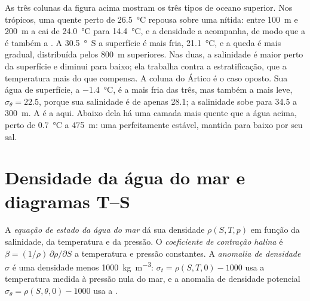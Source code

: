 As três colunas da figura acima mostram os três tipos de oceano superior. Nos trópicos, uma
 quente perto de \qty{26.5}{\celsius} repousa sobre uma  nítida: entre
\qty{100}{m} e \qty{200}{m} a  cai de \qty{24.0}{\celsius} para
\qty{14.4}{\celsius}, e a densidade a acompanha, de modo que a  é também a . A
\qty{30.5}{\degree S} a superfície é mais fria, \qty{21.1}{\celsius}, e a queda é mais gradual,
distribuída pelos \qty{800}{m} superiores. Nas duas, a salinidade é maior perto da superfície e
diminui para baixo; ela trabalha contra a estratificação, que a temperatura mais do que compensa.
A coluna do Ártico é o caso oposto. Sua água de superfície, a \qty{-1.4}{\celsius}, é a mais fria
das três, mas também a mais leve, $\sigma_\theta = 22.5$, porque sua salinidade é de apenas
\num{28.1}; a salinidade sobe para \num{34.5} a \qty{300}{m}. A  é a  aqui.
Abaixo dela há uma camada mais quente que a água acima, perto de \qty{0.7}{\celsius} a
\qty{475}{m}: uma  perfeitamente estável, mantida para baixo por seu sal.

\section{Densidade da água do mar e diagramas T--S}\label{sec:b1:fluid-envelopes-structure:ts}

\begin{definition}\label{def:b1:fluid-envelopes-structure:eos}
A \emph{equação de estado da água do mar} dá sua
densidade $\rho(S, T, p)$ em função da salinidade, da temperatura e da pressão. O
\emph{coeficiente de contração halina} é $\beta = (1/\rho)\,\partial\rho/\partial S$ a temperatura e pressão constantes. A
\emph{anomalia de densidade} $\sigma$ é uma densidade menos
\qty{1000}{kg.m^{-3}}: $\sigma_t = \rho(S, T, 0) -
1000$ usa a temperatura medida à pressão nula do mar, e a anomalia de densidade potencial
$\sigma_\theta = \rho(S, \theta, 0) - 1000$ usa a .
\end{definition}

